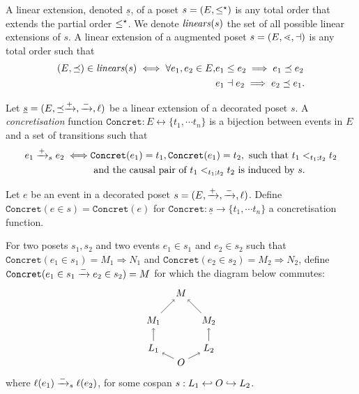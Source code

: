 \begin{definition}
  A linear extension, denoted $\underline{s}$, of a poset $s=(E,\leq^{\star})$ is any total order that extends the partial order $\leq^{\star}$. We denote $\mathit{linears}(s)$ the set of all possible linear extensions of $s$.
  A linear extension of a augmented poset $s=(E,\lessdot,\dashv)$ is any total order such that
  \begin{align*}
    (E,\preceq)\in\mathit{linears}(s) \iff \forall e_1,e_2\in E, &e_1\leq e_2\implies e_1\preceq e_2\\
    & e_1\dashv e_2\implies e_2\preceq e_1.
  \end{align*}
\end{definition}

\begin{definition}
  Let $\underline s=(E,\preceq\mathrel{\xrightarrow{+}},\mathrel{\xrightarrow{-}},\ell)$ be a linear extension of a decorated poset $s$. A \emph{concretisation} function  $\mathtt{Concret}:E\leftrightarrow \{t_1,\cdots t_n\}$ is a bijection between events in $E$ and a set of transitions such that
  \begin{align*}
    e_1\mathrel{\xrightarrow{+}}_s e_2 \iff& \mathtt{Concret}(e_1) = t_1, \mathtt{Concret}(e_1) = t_2, \text{ such that }t_1<_{t_1;t_2}t_2\\
    &\text{ and the causal pair of }t_1<_{t_1;t_2}t_2\text{ is induced by }s.
  \end{align*}
\end{definition}


\begin{definition}
  Let $e$ be an event in a decorated poset $s=(E,\mathrel{\xrightarrow{+}},\mathrel{\xrightarrow{-}},\ell)$.
  Define $\mathtt{Concret}(e\in s) = \mathtt{Concret}(e)$ for $\mathtt{Concret}:\underline{s}\to\{t_1,\cdots t_n\}$ a concretisation function.
\end{definition}

\begin{definition}
\label{def:ref_neg_infl}
  For two posets $s_1,s_2$ and two events $e_1\in s_1$ and $e_2\in s_2$ such that  $\mathtt{Concret}(e_1\in s_1) = M_1\Rightarrow N_1$ and $\mathtt{Concret}(e_2\in s_2) = M_2\Rightarrow N_2$, define $\mathtt{Concret}(e_1\in s_1\mathrel{\xrightarrow{-}} e_2\in s_2) = M$ for which the diagram below commutes:
  \[
  \begin{tikzpicture} %
    \node (o) at (0,-0.5) {\(O\)};
    \node (n) at (0,2) {\(M\)};
    \node (l1) at (-1,0) {\(L_1\)};
    \node (l2) at (1,0) {\(L_2\)};
    \node (n1) at (-1,1) {\(M_1\)};
    \node (n2) at (1,1) {\(M_2\)};
    \draw [->] (l1) -- (n1);
    \draw [->] (l2) -- (n2);
    \draw [->] (o) -- (l1);
    \draw [->] (o) -- (l2);
    \draw [->] (n1) -- (n);
    \draw [->] (n2) -- (n);
  \end{tikzpicture}
  \]
  where $\ell(e_1)\mathrel{\xrightarrow{-}}_s\ell(e_2)$, for some cospan $s:L_1\hookleftarrow O\hookrightarrow L_2$.
\end{definition}

